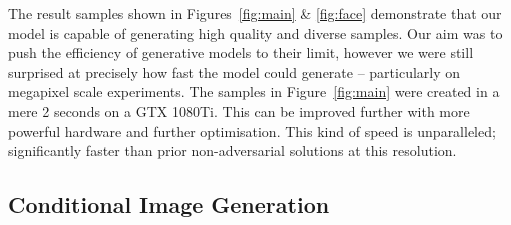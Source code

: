 The result samples shown in Figures~\ref{fig:main} \& \ref{fig:face} demonstrate
that our model is capable of generating high quality and diverse samples. Our
aim was to push the efficiency of generative models to their limit, however we
were still surprised at precisely how fast the model could generate --
particularly on megapixel scale experiments. The samples in
Figure~\ref{fig:main} were created in a mere 2 seconds on a GTX 1080Ti. This can
be improved further with more powerful hardware and further optimisation. This
kind of speed is unparalleled; significantly faster than prior non-adversarial
solutions at this resolution.

\subsection{Conditional Image Generation}
\label{subsec:evaluationConditional}

